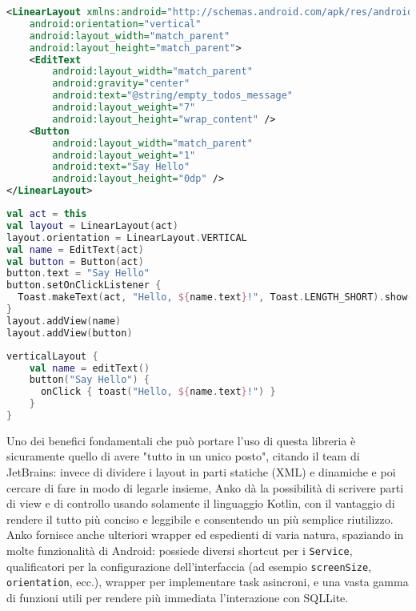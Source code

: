 \begin{lstlisting}[caption={Interfaccia definita in un file XML}, captionpos=b, label={lst:exAmpleAnkoXML}, language=XML]
<LinearLayout xmlns:android="http://schemas.android.com/apk/res/android"
    android:orientation="vertical"
    android:layout_width="match_parent"
    android:layout_height="match_parent">
    <EditText
        android:layout_width="match_parent"
        android:gravity="center"
        android:text="@string/empty_todos_message"
        android:layout_weight="7"
        android:layout_height="wrap_content" />
    <Button
        android:layout_width="match_parent"
        android:layout_weight="1"
        android:text="Say Hello"
        android:layout_height="0dp" />
</LinearLayout>
\end{lstlisting}

\begin{lstlisting}[caption={Interfaccia definita programmaticamente con un blocco di codice Kotlin semplice}, captionpos=b, label={lst:exAmpleAnkoKt}, language=Kotlin]
val act = this
val layout = LinearLayout(act)
layout.orientation = LinearLayout.VERTICAL
val name = EditText(act)
val button = Button(act)
button.text = "Say Hello"
button.setOnClickListener {
  Toast.makeText(act, "Hello, ${name.text}!", Toast.LENGTH_SHORT).show()
}
layout.addView(name)
layout.addView(button)
\end{lstlisting}

\begin{lstlisting}[caption={Interfaccia definita programmaticamente utilizzando i wrapper della libreria Anko}, captionpos=b, label={lst:exAmpleAnkoAnko}, language=Kotlin]
verticalLayout {
    val name = editText()
    button("Say Hello") {
      onClick { toast("Hello, ${name.text}!") }
    }
}
\end{lstlisting}

Uno dei benefici fondamentali che può portare l'uso di questa libreria è sicuramente quello di avere "tutto in un unico posto", citando il team di JetBrains: invece di dividere i layout in parti statiche (XML) e dinamiche e poi cercare di fare in modo di legarle insieme, Anko dà la possibilità di scrivere parti di view e di controllo usando solamente il linguaggio Kotlin, con il vantaggio di rendere il tutto più conciso e leggibile e consentendo un più semplice riutilizzo.\\
Anko fornisce anche ulteriori wrapper ed espedienti di varia natura, spaziando in molte funzionalità di Android: possiede diversi shortcut per i \texttt{Service}, qualificatori per la configurazione dell'interfaccia (ad esempio \texttt{screenSize}, \texttt{orientation}, ecc.), wrapper per implementare task asincroni, e una vasta gamma di funzioni utili per rendere più immediata l'interazione con SQLLite.\\

